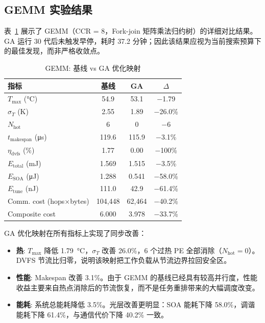 \documentclass[conference]{IEEEtran}
\begin{document}
\subsection{GEMM 实验结果}

表~\ref{tab:gemm} 展示了 GEMM（CCR = 8，Fork-join 矩阵乘法归约树）的详细对比结果。GA 运行 30 代后未触发早停，耗时 37.2 分钟；因此该结果应视为当前搜索预算下的最佳发现，而非严格收敛点。

\begin{table}[h]
\centering
\caption{GEMM: 基线 vs GA 优化映射}
\label{tab:gemm}
\begin{tabular}{lccc}
\toprule
\textbf{指标} & \textbf{基线} & \textbf{GA} & \textbf{$\Delta$} \\
\midrule
$T_{\max}$ (\si{\degreeCelsius}) & 54.9 & 53.1 & $-$1.79 \\
$\sigma_T$ (K) & 2.55 & 1.89 & $-$26.0\% \\
$N_{\text{hot}}$ & 6 & 0 & $-$6 \\
$t_{\text{makespan}}$ (\si{\micro\second}) & 119.6 & 115.9 & $-$3.1\% \\
$\eta_{\text{dvfs}}$ (\%) & 1.77 & 0.00 & $-$100\% \\
$E_{\text{total}}$ (\si{\milli\joule}) & 1.569 & 1.515 & $-$3.5\% \\
$E_{\text{SOA}}$ (\si{\micro\joule}) & 1.288 & 0.541 & $-$58.0\% \\
$E_{\text{tune}}$ (\si{\nano\joule}) & 111.0 & 42.9 & $-$61.4\% \\
Comm. cost (hops$\times$bytes) & 104,448 & 62,464 & $-$40.2\% \\
Composite cost & 6.000 & 3.978 & $-$33.7\% \\
\bottomrule
\end{tabular}
\end{table}

GA 优化映射在所有指标上实现了同步改善：

\begin{itemize}
\item \textbf{热}: $T_{\max}$ 降低 \SI{1.79}{\degreeCelsius}，$\sigma_T$ 改善 26.0\%，6 个过热 PE 全部消除（$N_{\text{hot}} = 0$）。DVFS 节流比归零，说明该映射把工作负载从节流边界拉回安全区。
\item \textbf{性能}: Makespan 改善 3.1\%。由于 GEMM 的基线已经具有较高并行度，性能收益主要来自热点消除后的节流恢复，而不是任务重排带来的大幅调度改变。
\item \textbf{能耗}: 系统总能耗降低 3.5\%。光层改善更明显：SOA 能耗下降 58.0\%，调谐能耗下降 61.4\%，与通信代价下降 40.2\% 一致。
\end{itemize}
\end{document}
